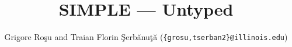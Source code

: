 
\setlength{\parindent}{1em}
\title{SIMPLE --- Untyped}
\author{Grigore Ro\c{s}u and 
        Traian Florin \c{S}erb\u{a}nu\c{t}\u{a} (\texttt{\{grosu,tserban2\}@illinois.edu})}

\maketitle

